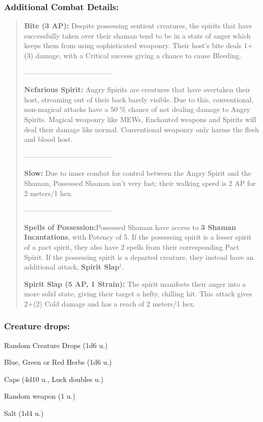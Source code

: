 \documentclass[11pt,a4paper,twocolumn]{book}
\begin{document}
	\subsubsection*{Additional Combat Details:}
	\begin{verse}
		\textbf{Bite (3 AP):} Despite possessing sentient creatures, the spirits that have successfully taken over their shaman tend to be in a state of anger which keeps them from using sophisticated weaponry. Their host's bite deals 1+(3) damage, with a Critical success giving a chance to cause Bleeding.
		
		--------------------------------------	
		
		\textbf{Nefarious Spirit:} Angry Spirits are creatures that have overtaken their host, streaming out of their back barely visible. Due to this, conventional, non-magical attacks have a 50 \% chance of not dealing damage to Angry Spirits. Magical weaponry like MEWs, Enchanted weapons and Spirits will deal their damage like normal. Conventional weaponry only harms the flesh and blood host.
		
		--------------------------------------	
		
		\textbf{Slow:} Due to inner combat for control between the Angry Spirit and the Shaman, Possessed Shaman isn't very fast; their walking speed is 2 AP for 2 meters/1 hex.
		
		--------------------------------------	
		
		\textbf{Spells of Possession:}Possessed Shaman have access to \textbf{3 Shaman Incantations}, with Potency of 5. If the possessing spirit is a lesser spirit of a pact spirit, they also have 2 spells from their corresponding Pact Spirit. If the possessing spirit is a departed creature, they instead have an additional attack, \textbf{Spirit Slap}$^{\dag}$.
		
		\textbf{\dag Spirit Slap (5 AP, 1 Strain):} The spirit manifests their anger into a more solid state, giving their target a hefty, chilling hit. This attack gives 2+(2) Cold damage and has a reach of 2 meters/1 hex.
%		
%		
		
	\end{verse}
	
	\subsubsection*{Creature drops:}
	\begin{compactitem}
		\item Random Creature Drops (1d6 u.)
		\item Blue, Green or Red Herbs (1d6 u.)
		\item Caps (4d10 u., Luck doubles u.)
		\item Random weapon (1 u.)
		\item Salt (1d4 u.)
	\end{compactitem}
\end{document}
